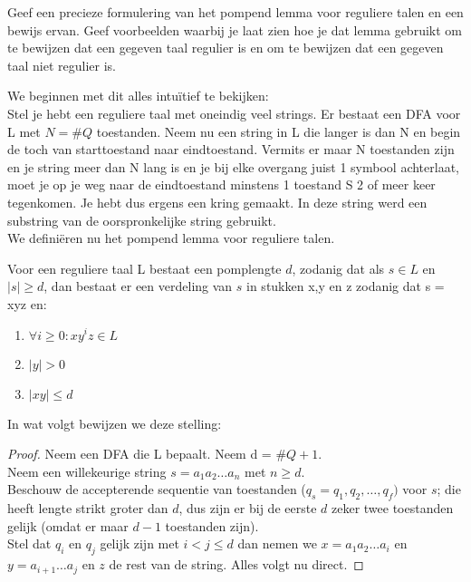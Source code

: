 \begin{question}
Geef een precieze formulering van het pompend lemma voor reguliere talen en een bewijs ervan. Geef voorbeelden waarbij je laat zien hoe je dat lemma gebruikt om te bewijzen dat een gegeven taal regulier is en om te bewijzen dat een gegeven taal niet regulier is.
\end{question}

We beginnen met dit alles intu\"itief te bekijken:\\
Stel je hebt een reguliere taal met oneindig veel strings. Er bestaat een DFA voor L met $N = \#Q$ toestanden. Neem nu een string in L die langer is dan N en begin de toch van starttoestand naar eindtoestand. Vermits er maar N toestanden zijn en je string meer dan N lang is en je bij elke overgang juist 1 symbool achterlaat, moet je op je weg naar de eindtoestand minstens 1 toestand S 2 of meer keer tegenkomen. Je hebt dus ergens een kring gemaakt. In deze string werd een substring van de oorspronkelijke string gebruikt.\\
We defini\"eren nu het pompend lemma voor reguliere talen.

\begin{theorem}
Voor een reguliere taal L bestaat een pomplengte $d$, zodanig dat als $s \in L$ en $|s| \geq d$, dan bestaat er een verdeling van $s$ in stukken x,y en z zodanig dat s = xyz en:
\begin{enumerate}
\item $\forall i \geq 0 : xy^iz \in L$
\item $|y| > 0$
\item $|xy| \leq d$
\end{enumerate}
\end{theorem}

In wat volgt bewijzen we deze stelling:

\begin{proof}
Neem een DFA die L bepaalt. Neem d = $\#Q+1$.\\
Neem een willekeurige string $s = a_1a_2 \hdots a_n$ met $n \geq d$. \\
Beschouw de accepterende sequentie van toestanden ($q_s = q_1,q_2,\hdots,q_f)$ voor $s$; die heeft lengte strikt groter dan $d$, dus zijn er bij de eerste $d$ zeker twee toestanden gelijk (omdat er maar $d-1$ toestanden zijn).\\
Stel dat $q_i$ en $q_j$ gelijk zijn met $i<j \leq d$ dan nemen we $x=a_1a_2\hdots a_i$ en $y=a_{i+1} \hdots a_j$ en $z$ de rest van de string. Alles volgt nu direct.
\end{proof}

